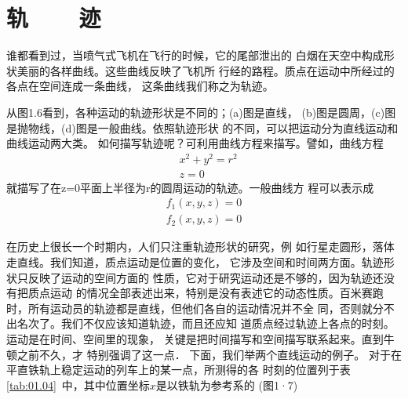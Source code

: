 \section[轨迹]{轨~~~~迹}
\label{sec:01.05}
    谁都看到过，当喷气式飞机在飞行的时候，它的尾部泄出的
白烟在天空中构成形状美丽的各样曲线。这些曲线反映了飞机所
行经的路程。质点在运动中所经过的各点在空间连成一条曲线，
这条曲线我们称之为轨迹。

    从图1.6看到，各种运动的轨迹形状是不同的；(a)图是直线，
(b)图是圆周，(c)图是抛物线，(d)图是一般曲线。依照轨迹形状
的不同，可以把运动分为直线运动和曲线运动两大类。
    如何描写轨迹呢？可利用曲线方程来描写。譬如，曲线方程
\begin{align*}
    & x^2+y^2=r^2 \\
    & z=0
\end{align*}
就描写了在z=0平面上半径为r的圆周运动的轨迹。一般曲线方
程可以表示成
\begin{align*}
    f_1(x,y,z)=0 \\
    f_2(x,y,z)=0
\end{align*}

    在历史上很长一个时期内，人们只注重轨迹形状的研究，例
如行星走圆形，落体走直线。我们知道，质点运动是位置的变化，
它涉及空间和时间两方面。轨迹形状只反映了运动的空间方面的
性质，它对于研究运动还是不够的，因为轨迹还没有把质点运动
的情况全部表述出来，特别是没有表述它的动态性质。百米赛跑
时，所有运动员的轨迹都是直线，但他们各自的运动情况并不全
同，否则就分不出名次了。我们不仅应该知道轨迹，而且还应知
道质点经过轨迹上各点的时刻。运动是在时间、空间里的现象，
关键是把时间描写和空间描写联系起来。直到牛顿之前不久，才
特别强调了这一点．
    下面，我们举两个直线运动的例子。
    对于在平直铁轨上稳定运动的列车上的某一点，所测得的各
时刻的位置列于表\ref{tab:01.04}~中，其中位置坐标$x$是以铁轨为参考系的
(图1·7)
\begin{table}[!h]
    \vspace{-0.5em}
    \caption{}
    \label{tab:01.04}
    \centering
    \vspace{-1.2em}
\end{table}

